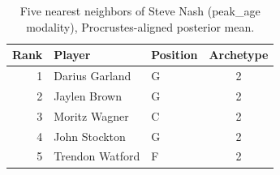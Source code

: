 \begin{table}[htbp]
  \centering\small
  \begin{tabular}{rllc}
    \toprule
    Rank & Player & Position & Archetype \\
    \midrule
    1 & Darius Garland & G & 2 \\
    2 & Jaylen Brown & G & 2 \\
    3 & Moritz Wagner & C & 2 \\
    4 & John Stockton & G & 2 \\
    5 & Trendon Watford & F & 2 \\
    \bottomrule
  \end{tabular}
  \caption{Five nearest neighbors of Steve Nash (peak_age modality), Procrustes-aligned posterior mean.}
  \label{tab:Steve_Nash_neighbors_peak_age}
\end{table}

